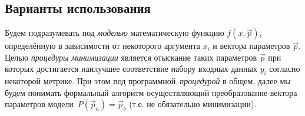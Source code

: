 \subsection{Варианты использования}

Будем подразумевать под \emph{моделью} математическую
функцию $f(x,\vec{p})$, определённую в зависимости от некоторого
аргумента $x_i$ и вектора параметров $\vec{p}$. Целью
\emph{процедуры минимизации} является отыскание таких параметров $\vec{p}$
при которых достигается наилучшее соответствие набору входных данных $y_i$
согласно некоторой метрике.
При этом под программной~\emph{процедурой} в общем, далее мы будем понимать формальный
алгоритм осуществляющий преобразование вектора параметров
модели~$P(\vec{p}_a) = \vec{p}_b$ (т.е. не обязательно
минимизации).

